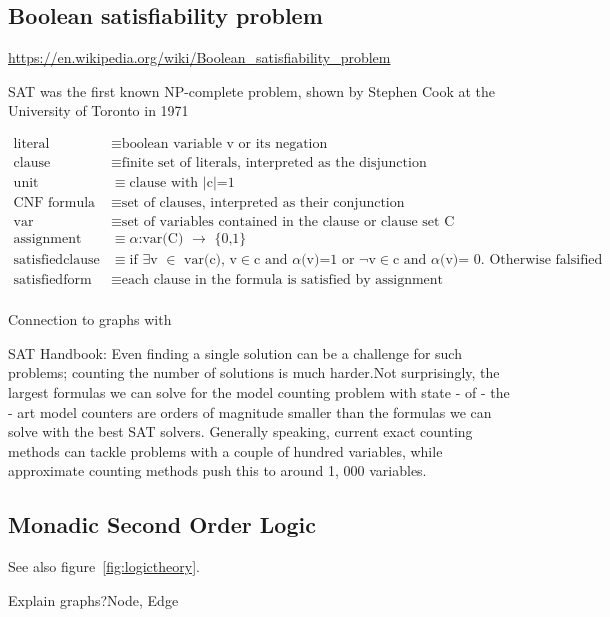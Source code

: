 \documentclass[a4paper, 12pt]{scrartcl}
\begin{document}
\subsection{Boolean satisfiability problem}
\url{https://en.wikipedia.org/wiki/Boolean_satisfiability_problem}

SAT was the first known NP-complete problem, shown by Stephen Cook at the University of Toronto in 1971 \cite{SAT1971}

\begin{align*}
\text{literal}&\equiv \text{boolean variable v or its negation} \\
\text{clause}&\equiv \text{finite set of literals, interpreted as the disjunction} \\
\text{unit}&\equiv \text{clause with $|$c$|$=1} \\
\text{CNF formula}&\equiv \text{set of clauses, interpreted as their conjunction} \\
\text{var}&\equiv \text{set of variables contained in the clause or clause set C} \\
\text{assignment}&\equiv \text{$\alpha $:var(C) $\to $ \{0,1\}} \\
\text{satisfiedclause}&\equiv \text{if $\exists $v $\in $ var(c), v$\in $c and $\alpha $(v)=1 or $\neg $v$\in $c and $\alpha $(v)= 0. Otherwise falsified}\\ 
\text{satisfiedform}&\equiv \text{each clause in the formula is satisfied by assignment} \\
\end{align*}

Connection to graphs with \cite{DiplomarbeitZisser}

SAT Handbook:
Even finding a single solution can be a challenge
for such problems; counting the number of solutions is much harder.Not
surprisingly, the largest formulas we can solve for the model counting problem
with state - of - the - art model counters are orders of magnitude smaller than the
formulas we can solve with the best SAT solvers. Generally speaking, current
exact counting methods can tackle problems with a couple of hundred variables, while approximate counting methods push this to around 1, 000 variables.


\subsection{Monadic Second Order Logic}
See also figure~\ref{fig:logictheory}.

Explain graphs?Node, Edge
\end{document}
